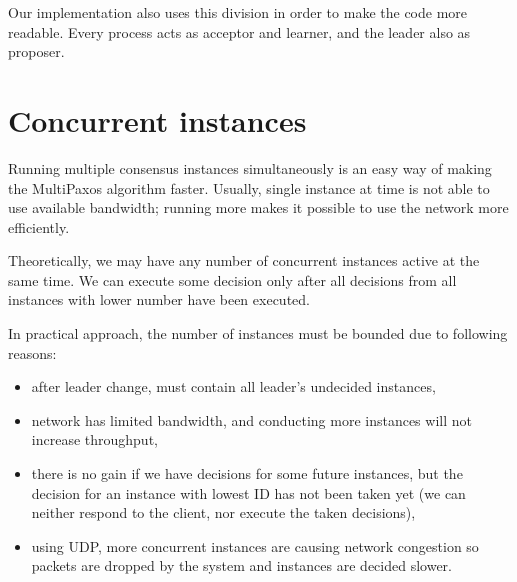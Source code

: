 Our implementation also uses this division in order to make the code more readable. Every process acts as acceptor and learner, and the leader also as proposer.

\section{Concurrent instances}
\label{subsec:concurrent_instances}
Running multiple consensus instances simultaneously is an easy way of making the MultiPaxos algorithm faster. Usually, single instance at time is not able to use available bandwidth; running more makes it possible to use the network more efficiently.

Theoretically, we may have any number of concurrent instances active at the same time. We can execute some decision only after all decisions from all instances with lower number have been executed.

In practical approach, the number of instances must be bounded due to following reasons:
\begin{itemize} 
  \item after leader change, \prepareOK must contain all leader's undecided instances,
  \item network has limited bandwidth, and conducting more instances will not increase throughput,
  \item there is no gain if we have decisions for some future instances, but the decision for an instance with lowest ID has not been taken yet (we can neither respond to the client, nor execute the taken decisions),
  \item using UDP, more concurrent instances are causing network congestion so packets are dropped by the system and instances are decided slower.
\end{itemize}

